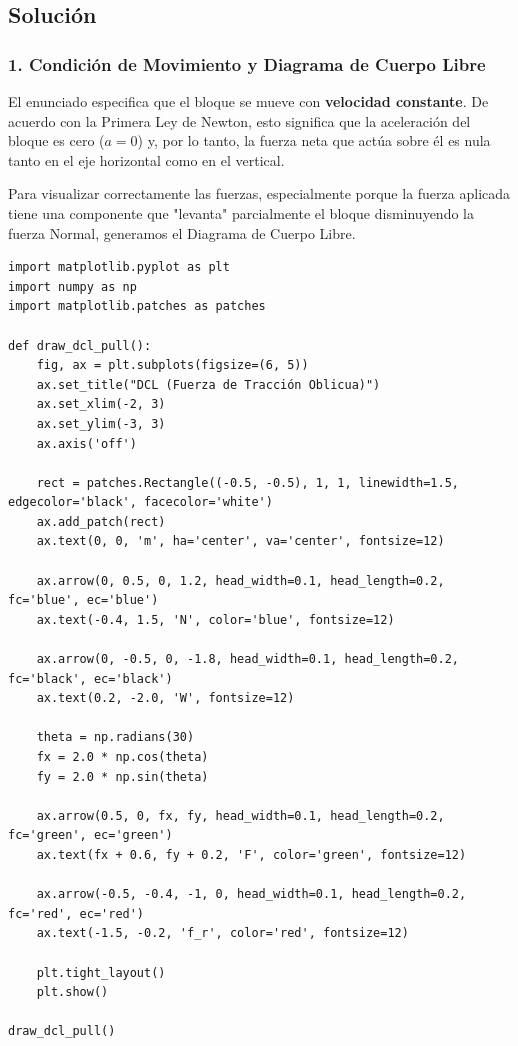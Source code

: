 \documentclass[12pt, a4paper]{article}
\begin{document}
\begin{center}
\end{center}

\subsection*{Solución}

\subsubsection*{1. Condición de Movimiento y Diagrama de Cuerpo Libre}
El enunciado especifica que el bloque se mueve con \textbf{velocidad constante}. De acuerdo con la Primera Ley de Newton, esto significa que la aceleración del bloque es cero ($a = 0$) y, por lo tanto, la fuerza neta que actúa sobre él es nula tanto en el eje horizontal como en el vertical.

Para visualizar correctamente las fuerzas, especialmente porque la fuerza aplicada tiene una componente que "levanta" parcialmente el bloque disminuyendo la fuerza Normal, generamos el Diagrama de Cuerpo Libre.

\begin{lstlisting}
import matplotlib.pyplot as plt
import numpy as np
import matplotlib.patches as patches

def draw_dcl_pull():
    fig, ax = plt.subplots(figsize=(6, 5))
    ax.set_title("DCL (Fuerza de Tracción Oblicua)")
    ax.set_xlim(-2, 3)
    ax.set_ylim(-3, 3)
    ax.axis('off')
    
    rect = patches.Rectangle((-0.5, -0.5), 1, 1, linewidth=1.5, edgecolor='black', facecolor='white')
    ax.add_patch(rect)
    ax.text(0, 0, 'm', ha='center', va='center', fontsize=12)
    
    ax.arrow(0, 0.5, 0, 1.2, head_width=0.1, head_length=0.2, fc='blue', ec='blue')
    ax.text(-0.4, 1.5, 'N', color='blue', fontsize=12)
    
    ax.arrow(0, -0.5, 0, -1.8, head_width=0.1, head_length=0.2, fc='black', ec='black')
    ax.text(0.2, -2.0, 'W', fontsize=12)
    
    theta = np.radians(30)
    fx = 2.0 * np.cos(theta)
    fy = 2.0 * np.sin(theta)
    
    ax.arrow(0.5, 0, fx, fy, head_width=0.1, head_length=0.2, fc='green', ec='green')
    ax.text(fx + 0.6, fy + 0.2, 'F', color='green', fontsize=12)
    
    ax.arrow(-0.5, -0.4, -1, 0, head_width=0.1, head_length=0.2, fc='red', ec='red')
    ax.text(-1.5, -0.2, 'f_r', color='red', fontsize=12)

    plt.tight_layout()
    plt.show()

draw_dcl_pull()
\end{lstlisting}
\end{document}
